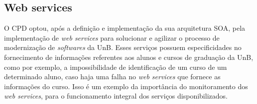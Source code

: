 
\subsection{Web services}


O CPD optou, após a definição e implementação da sua arquitetura SOA, pela implementação de \textit{web services} para solucionar e agilizar o processo de modernização de \textit{softwares} da UnB. Esses serviços possuem especificidades no fornecimento de informações referentes aos alunos e cursos de graduação da UnB,  como por exemplo, a impossibilidade de identificação de um curso de um determinado aluno, caso haja uma falha no \textit{web services} que fornece as informações do curso. Isso é um exemplo da importância do monitoramento dos \textit{web services}, para o funcionamento integral dos serviços disponibilizados.   


